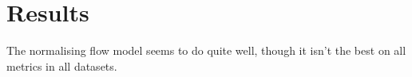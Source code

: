 \documentclass{article}
\newcommand{\E}{\mathbb{E}}
\newcommand{\bt}{\mathbf{t}}
\newcommand{\bX}{\mathbf{X}}
\newcommand{\by}{\mathbf{y}}
\begin{document}




\section*{Results}
The normalising flow model seems to do quite well, though it isn't the best on all metrics in all datasets. 
\end{document}
